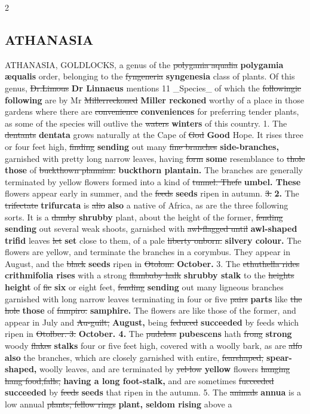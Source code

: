 \documentclass[10pt]{article}
\begin{document}
\begin{multicols}{2}
\subsection*{ATHANASIA}
ATHANASIA, GOLDLOCKS, a genus of the \sout{polygania aqualia} \textbf{polygamia æqualis} order, belonging to the \sout{fyngeneria} \textbf{syngenesia} class of plants. Of this genus, \sout{Dr.Limous} \textbf{Dr Linnaeus} mentions 11 \_Species\_ of which the \sout{followingic} \textbf{following} are by Mr \sout{Millerreckoned} \textbf{Miller reckoned} worthy of a place in those gardens where there are \sout{convenience} \textbf{conveniences} for preferring tender plants, as some of the species will outlive the \sout{waters} \textbf{winters} of this country. 1. The \sout{dentants} \textbf{dentata} grows naturally at the Cape of \sout{God} \textbf{Good} Hope. It rises three or four feet high, \sout{finding} \textbf{sending} out many \sout{fine branches} \textbf{side-branches,} garnished with pretty long narrow leaves, having \sout{form} \textbf{some} resemblance to \sout{thole} \textbf{those} of \sout{buckthown plannian.} \textbf{buckthorn plantain.} The branches are generally terminated by yellow flowers formed into a kind of \sout{tunnel. Thefe} \textbf{umbel. These} flowers appear early in summer, and the \sout{feeds} \textbf{seeds} ripen in autumn. \sout{3.} \textbf{2.} The \sout{trifectate} \textbf{trifurcata} is \sout{alio} \textbf{also} a native of Africa, as are the three following sorts. It is a \sout{damby} \textbf{shrubby} plant, about the height of the former, \sout{fending} \textbf{sending} out several weak shoots, garnished with \sout{awl-flagged until} \textbf{awl-shaped trifid} leaves \sout{let} \textbf{set} close to them, of a pale \sout{liberty onborn.} \textbf{silvery colour.} The flowers are yellow, and terminate the branches in a corymbus. They appear in August, and the \sout{black} \textbf{seeds} ripen in \sout{Otolom.} \textbf{October.} 3. The \sout{ethuthella rides} \textbf{crithmifolia rises} with a strong \sout{flambaby halk} \textbf{shrubby stalk} to the \sout{heights} \textbf{height} of \sout{fic} \textbf{six} or eight feet, \sout{fending} \textbf{sending} out many ligneous branches garnished with long narrow leaves terminating in four or five \sout{pairs} \textbf{parts} like \sout{the hole} \textbf{those} of \sout{fampiro.} \textbf{samphire.} The flowers are like those of the former, and appear in July and \sout{Au-guilt,} \textbf{August,} being \sout{feduced} \textbf{succeeded} by feeds which ripen in \sout{Otolber. 3.} \textbf{October. 4.} The \sout{pudeless} \textbf{pubescens} hath \sout{frong} \textbf{strong} woody \sout{flakes} \textbf{stalks} four or five feet high, covered with a woolly bark, as are \sout{alfo} \textbf{also} the branches, which are closely garnished with entire, \sout{fearshaped,} \textbf{spear-shaped,} woolly leaves, and are terminated by \sout{yel-low} \textbf{yellow} flowers \sout{hanging hang food,falls,} \textbf{having a long foot-stalk,} and are sometimes \sout{fucceeded} \textbf{succeeded} by \sout{feeds} \textbf{seeds} that ripen in the autumn. 5. The \sout{animals} \textbf{annua} is a low annual \sout{plants, fellow rings} \textbf{plant, seldom rising} above a 
\end{multicols}
\end{document}
